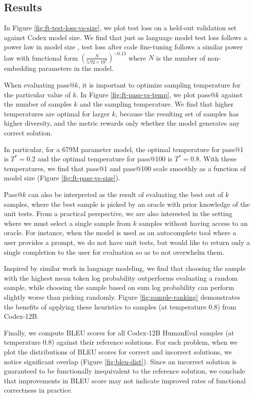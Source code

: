 \subsection{Results}
\label{sec:ft:results}

In Figure \ref{fig:ft-test-loss-vs-size}, we plot test loss on a held-out validation set against Codex model size. We find that just as language model test loss follows a power law in model size \citep{kaplan2020scaling}, test loss after code fine-tuning follows a similar power law with functional form $ (\frac{N}{5.92 \times 10^7}) ^ {-0.13}$ where $N$ is the number of non-embedding parameters in the model.

When evaluating pass@$k$, it is important to optimize sampling temperature for the particular value of $k$. In Figure \ref{fig:ft-pass-vs-temp}, we plot pass@$k$ against the number of samples $k$ and the sampling temperature. We find that higher temperatures are optimal for larger $k$, because the resulting set of samples has higher diversity, and the metric rewards only whether the model generates any correct solution.

In particular, for a 679M parameter model, the optimal temperature for pass@1 is $T^*=0.2$ and the optimal temperature for pass@100 is $T^*=0.8$. With these temperatures, we find that pass@1 and pass@100 scale smoothly as a function of model size (Figure \ref{fig:ft-pass-vs-size}).

Pass@$k$ can also be interpreted as the result of evaluating the best out of $k$ samples, where the best sample is picked by an oracle with prior knowledge of the unit tests. From a practical perspective, we are also interested in the setting where we must select a single sample from $k$ samples without having access to an oracle. For instance, when the model is used as an autocomplete tool where a user provides a prompt, we do not have unit tests, but would like to return only a single completion to the user for evaluation so as to not overwhelm them.

Inspired by similar work in language modeling, we find that choosing the sample with the highest mean token log probability outperforms evaluating a random sample, while choosing the sample based on sum log probability can perform slightly worse than picking randomly. Figure \ref{fig:sample-ranking} demonstrates the benefits of applying these heuristics to samples (at temperature 0.8) from Codex-12B.

Finally, we compute BLEU scores for all Codex-12B HumanEval samples (at temperature 0.8) against their reference solutions. For each problem, when we plot the distributions of BLEU scores for correct and incorrect solutions, we notice significant overlap (Figure \ref{fig:bleu-dist}). Since an incorrect solution is guaranteed to be functionally inequivalent to the reference solution, we conclude that improvements in BLEU score may not indicate improved rates of functional correctness in practice.

